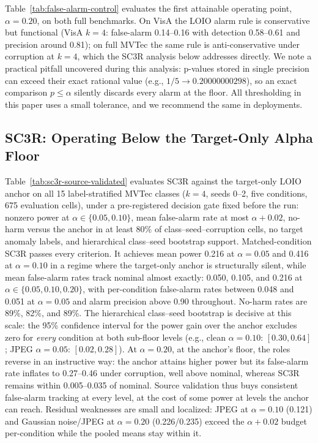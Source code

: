 
Table~\ref{tab:false-alarm-control} evaluates the first attainable operating point, $\alpha{=}0.20$, on both full benchmarks. On VisA the LOIO alarm rule is conservative but functional (VisA $k{=}4$: false-alarm 0.14--0.16 with detection 0.58--0.61 and precision around 0.81); on full MVTec the same rule is anti-conservative under corruption at $k{=}4$, which the SC3R analysis below addresses directly. We note a practical pitfall uncovered during this analysis: p-values stored in single precision can exceed their exact rational value (e.g., $1/5\rightarrow0.20000000298$), so an exact comparison $p\le\alpha$ silently discards every alarm at the floor. All thresholding in this paper uses a small tolerance, and we recommend the same in deployments.

\subsection{SC3R: Operating Below the Target-Only Alpha Floor}

Table~\ref{tab:sc3r-source-validated} evaluates SC3R against the target-only LOIO anchor on all 15 label-stratified MVTec classes ($k{=}4$, seeds 0--2, five conditions, 675 evaluation cells), under a pre-registered decision gate fixed before the run: nonzero power at $\alpha\in\{0.05,0.10\}$, mean false-alarm rate at most $\alpha{+}0.02$, no-harm versus the anchor in at least 80\% of class--seed--corruption cells, no target anomaly labels, and hierarchical class--seed bootstrap support. Matched-condition SC3R passes every criterion. It achieves mean power 0.216 at $\alpha{=}0.05$ and 0.416 at $\alpha{=}0.10$ in a regime where the target-only anchor is structurally silent, while mean false-alarm rates track nominal almost exactly: 0.050, 0.105, and 0.216 at $\alpha\in\{0.05,0.10,0.20\}$, with per-condition false-alarm rates between 0.048 and 0.051 at $\alpha{=}0.05$ and alarm precision above 0.90 throughout. No-harm rates are 89\%, 82\%, and 89\%. The hierarchical class--seed bootstrap is decisive at this scale: the 95\% confidence interval for the power gain over the anchor excludes zero for \emph{every} condition at both sub-floor levels (e.g., clean $\alpha{=}0.10$: $[0.30,0.64]$; JPEG $\alpha{=}0.05$: $[0.02,0.28]$). At $\alpha{=}0.20$, at the anchor's floor, the roles reverse in an instructive way: the anchor attains higher power but its false-alarm rate inflates to 0.27--0.46 under corruption, well above nominal, whereas SC3R remains within 0.005--0.035 of nominal. Source validation thus buys consistent false-alarm tracking at every level, at the cost of some power at levels the anchor can reach. Residual weaknesses are small and localized: JPEG at $\alpha{=}0.10$ (0.121) and Gaussian noise/JPEG at $\alpha{=}0.20$ (0.226/0.235) exceed the $\alpha{+}0.02$ budget per-condition while the pooled means stay within it.

